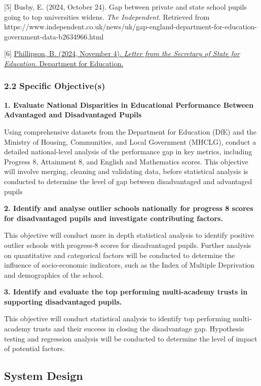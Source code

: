 \documentclass[
  letterpaper,
  DIV=11,
  numbers=noendperiod]{scrartcl}
\begin{document}
{[}5{]} Busby, E. (2024, October 24). Gap between private and state
school pupils going to top universities widens. \emph{The Independent}.
Retrieved from
https://www.independent.co.uk/news/uk/gap-england-department-for-education-government-data-b2634966.html

{[}6{]}
\href{Letter\%20from\%20the\%20Education\%20Secretary\%204.11.24\%20(002).pdf}{Phillipson,
B. (2024, November 4). \emph{Letter from the Secretary of State for
Education}. Department for Education.}

\subsubsection{2.2 Specific Objective(s)}\label{specific-objectives}

\textbf{1. Evaluate National Disparities in Educational Performance
Between Advantaged and Disadvantaged Pupils}

Using comprehensive datasets from the Department for Education (DfE) and
the Ministry of Housing, Communities, and Local Government (MHCLG),
conduct a detailed national-level analysis of the performance gap in key
metrics, including Progress 8, Attainment 8, and English and Mathematics
scores. This objective will involve merging, cleaning and validating
data, before statistical analysis is conducted to determine the level of
gap between disadvantaged and advantaged pupils

\textbf{2. Identify and analyse outlier schools nationally for progress
8 scores for disadvantaged pupils and investigate contributing factors.}

This objective will conduct more in depth statistical analysis to
identify positive outlier schools with progress-8 scores for
disadvantaged pupils. Further analysis on quantitative and categorical
factors will be conducted to determine the influence of socio-economic
indicators, such as the Index of Multiple Deprivation and demographics
of the school.

\textbf{3. Identify and evaluate the top performing multi-academy trusts
in supporting disadvantaged pupils.}

This objective will conduct statistical analysis to identify top
performing multi-academy trusts and their success in closing the
disadvantage gap. Hypothesis testing and regression analysis will be
conducted to determine the level of impact of potential factors.

\subsection{System Design}\label{system-design}
\end{document}
